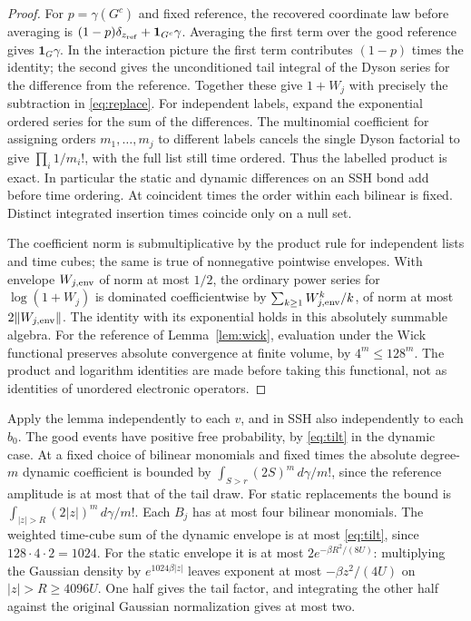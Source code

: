 \documentclass[11pt]{article}
\begin{document}
\begin{proof}
For $p=\gamma(G^c)$ and fixed reference, the recovered coordinate law before averaging is $(1-p)\delta_{z_{\rm ref}}+\mathbf 1_{G^c}\gamma$. Averaging the first term over the good reference gives $\mathbf 1_G\gamma$. In the interaction picture the first term contributes $(1-p)$ times the identity; the second gives the unconditioned tail integral of the Dyson series for the difference from the reference. Together these give $1+W_j$ with precisely the subtraction in \eqref{eq:replace}. For independent labels, expand the exponential ordered series for the sum of the differences. The multinomial coefficient for assigning orders $m_1,\dots,m_j$ to different labels cancels the single Dyson factorial to give $\prod_i1/m_i!$, with the full list still time ordered. Thus the labelled product is exact. In particular the static and dynamic differences on an SSH bond add before time ordering. At coincident times the order within each bilinear is fixed. Distinct integrated insertion times coincide only on a null set.

The coefficient norm is submultiplicative by the product rule for independent lists and time cubes; the same is true of nonnegative pointwise envelopes. With envelope $W_{j,\rm env}$ of norm at most $1/2$, the ordinary power series for $\log(1+W_j)$ is dominated coefficientwise by $\sum_{k\ge1} W_{j,\rm env}^k/k$, of norm at most $2\|W_{j,\rm env}\|$. The identity with its exponential holds in this absolutely summable algebra. For the reference of Lemma~\ref{lem:wick}, evaluation under the Wick functional preserves absolute convergence at finite volume, by $4^m\le128^m$. The product and logarithm identities are made before taking this functional, not as identities of unordered electronic operators.
\end{proof}

Apply the lemma independently to each $v$, and in SSH also independently to each $b_0$. The good events have positive free probability, by \eqref{eq:tilt} in the dynamic case. At a fixed choice of bilinear monomials and fixed times the absolute degree-$m$ dynamic coefficient is bounded by $\int_{S>r}(2S)^m\,d\gamma/m!$, since the reference amplitude is at most that of the tail draw. For static replacements the bound is $\int_{|z|>R}(2|z|)^m\,d\gamma/m!$. Each $B_j$ has at most four bilinear monomials. The weighted time-cube sum of the dynamic envelope is at most \eqref{eq:tilt}, since $128\cdot4\cdot2=1024$. For the static envelope it is at most $2e^{-\beta R^2/(8U)}$: multiplying the Gaussian density by $e^{1024\beta |z|}$ leaves exponent at most $-\beta z^2/(4U)$ on $|z|>R\ge4096U$. One half gives the tail factor, and integrating the other half against the original Gaussian normalization gives at most two.
\end{document}
